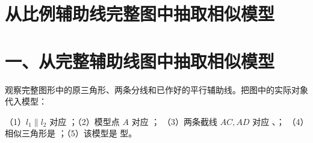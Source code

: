 \documentclass{exam-zh}
\begin{document}
\section*{从比例辅助线完整图中抽取相似模型}

\section*{一、从完整辅助线图中抽取相似模型}


\begin{problem}[points=10]
  \noindent
  \begin{minipage}[t]{\dimexpr\linewidth-60mm-6mm\relax}
    \vspace{0pt}
    观察完整图形中的原三角形、两条分线和已作好的平行辅助线。把图中的实际对象代入模型：

（1）$l_1\parallel l_2$ 对应 \underline{\hspace{2cm}}；（2）模型点 $A$ 对应 \underline{\hspace{1cm}}；
（3）两条截线 $AC,AD$ 对应 \underline{\hspace{1.5cm}}、\underline{\hspace{1.5cm}}；
（4）相似三角形是 \underline{\hspace{4cm}}；（5）该模型是 \underline{\hspace{1.5cm}} 型。


  \end{minipage}\hfill
  \begin{diagramcoltikz}{60mm}{第 1 题图}
  }
  \end{diagramcoltikz}
  \par\medskip
  \answerarea[32mm]
\end{problem}


\end{document}
